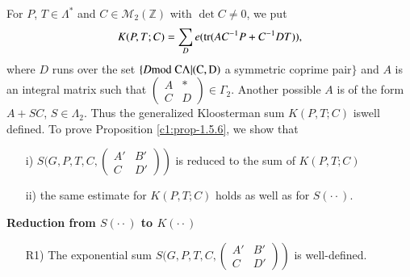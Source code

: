 For $P$, $T\in\Lambda^{\ast}$ and $C\in\mathscr{M}_{2}(\mathbb{Z})$
with $\det C\neq 0$, we put
$$
K(P,T;C)=\sum_{D}e(\operatorname{tr}(AC^{-1}P+C^{-1}DT)),
$$
where $D$ runs over the set $\{D\rm{mod} \; C\Lambda|(C,D)$ a symmetric
coprime pair$\}$ and $A$ is an integral matrix such that
$\left(\begin{smallmatrix} A & \ast\\ C & D
\end{smallmatrix}\right)\in \Gamma_{2}$. Another possible $A$ is of
the form $A+SC$, $S\in\Lambda_{2}$. Thus the generalized Kloosterman
sum $K(P,T;C)$ is\pageoriginale well defined. To prove Proposition
\ref{c1:prop-1.5.6}, we show that
\begin{itemize}
\item[i)] $S(G,P,T,C,\left.\left(\begin{smallmatrix} A' & B'\\ C & D'
\end{smallmatrix}\right)\right)$ is reduced to the sum of $K(P,T;C)$

\item[ii)] the same estimate for $K(P,T;C)$ holds as well as for
  $S(\cdot\cdot)$. 
\end{itemize}

\medskip
\noindent
{\bf Reduction from $S(\cdot\cdot)$ to $K(\cdot\cdot)$}
\begin{itemize}
\item[R1)] The exponential sum
  $S(G,P,T,C,\left.\left(\begin{smallmatrix} A' & B'\\ C & D'
\end{smallmatrix}\right)\right)$ is well-defined.
\end{itemize}

